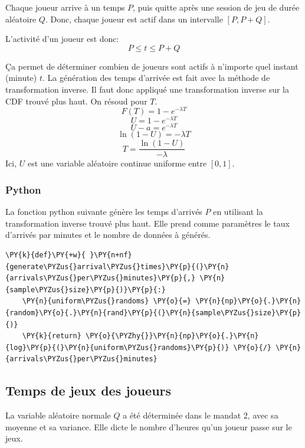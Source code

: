     Chaque joueur arrive à un temps \(P\), puis quitte après une session de
jeu de durée aléatoire \(Q\). Donc, chaque joueur est actif dans un
intervalle \([P, P+Q]\).

L'activité d'un joueur est donc: \[
P \le t \le P + Q
\]

Ça permet de déterminer combien de joueurs sont actifs à n'importe quel
instant (minute) \(t\). La génération des temps d'arrivée est fait avec
la méthode de transformation inverse. Il faut donc appliqué une
transformation inverse sur la CDF trouvé plus haut. On résoud pour
\(T\). \[
F(T)=1 - e^{-\lambda T}
\] \[
U = 1 - e^{-\lambda T}
\] \[
U - a = e^{-\lambda T}
\] \[
\ln(1 - U) = -\lambda T
\] \[
T = \frac{\ln(1 - U)}{-\lambda}
\] Ici, \(U\) est une variable aléatoire continue uniforme entre
\([0,1]\).

    \subsubsection{Python}\label{python}

La fonction python suivante génère les temps d'arrivés \(P\) en
utilisant la transformation inverse trouvé plus haut. Elle prend comme
paramètres le taux d'arrivés par minutes et le nombre de données à
générés.

    \begin{tcolorbox}[breakable, size=fbox, boxrule=1pt, pad at break*=1mm,colback=cellbackground, colframe=cellborder]
\begin{Verbatim}[commandchars=\\\{\}]
\PY{k}{def}\PY{+w}{ }\PY{n+nf}{generate\PYZus{}arrival\PYZus{}times}\PY{p}{(}\PY{n}{arrivals\PYZus{}per\PYZus{}minutes}\PY{p}{,} \PY{n}{sample\PYZus{}size}\PY{p}{)}\PY{p}{:}
    \PY{n}{uniform\PYZus{}randoms} \PY{o}{=} \PY{n}{np}\PY{o}{.}\PY{n}{random}\PY{o}{.}\PY{n}{rand}\PY{p}{(}\PY{n}{sample\PYZus{}size}\PY{p}{)}
    \PY{k}{return} \PY{o}{\PYZhy{}}\PY{n}{np}\PY{o}{.}\PY{n}{log}\PY{p}{(}\PY{n}{uniform\PYZus{}randoms}\PY{p}{)} \PY{o}{/} \PY{n}{arrivals\PYZus{}per\PYZus{}minutes}
\end{Verbatim}
\end{tcolorbox}

    \subsection{Temps de jeux des joueurs}\label{temps-de-jeux-des-joueurs}

La variable aléatoire normale \(Q\) a été déterminée dans le mandat 2,
avec sa moyenne et sa variance. Elle dicte le nombre d'heures qu'un
joueur passe sur le jeux.

